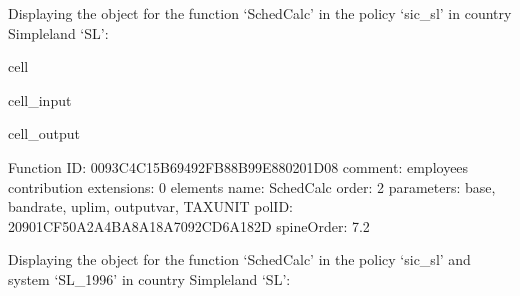 \documentclass[letterpaper,10pt,english]{sphinxmanual}
\begin{document}
\sphinxAtStartPar
Displaying the  object for the function ‘SchedCalc’ in the policy ‘sic\_sl’ in country Simpleland ‘SL’:

\begin{sphinxuseclass}{cell}
\begin{sphinxuseclass}{cell_input}
\begin{sphinxVerbatim}[commandchars=\\\{\}]
\PYG{p}{[}\PYG{p}{]}\PYG{p}{[}\PYG{p}{]}\PYG{p}{[}\PYG{p}{]}
\end{sphinxVerbatim}

\end{sphinxuseclass}
\begin{sphinxuseclass}{cell_output}
\begin{sphinxVerbatim}[commandchars=\\\{\}]
\PYGZhy{}\PYGZhy{}\PYGZhy{}\PYGZhy{}\PYGZhy{}\PYGZhy{}\PYGZhy{}\PYGZhy{}\PYGZhy{}\PYGZhy{}\PYGZhy{}\PYGZhy{}\PYGZhy{}\PYGZhy{}\PYGZhy{}\PYGZhy{}\PYGZhy{}\PYGZhy{}\PYGZhy{}\PYGZhy{}\PYGZhy{}\PYGZhy{}\PYGZhy{}\PYGZhy{}\PYGZhy{}\PYGZhy{}\PYGZhy{}\PYGZhy{}\PYGZhy{}\PYGZhy{}
Function
\PYGZhy{}\PYGZhy{}\PYGZhy{}\PYGZhy{}\PYGZhy{}\PYGZhy{}\PYGZhy{}\PYGZhy{}\PYGZhy{}\PYGZhy{}\PYGZhy{}\PYGZhy{}\PYGZhy{}\PYGZhy{}\PYGZhy{}\PYGZhy{}\PYGZhy{}\PYGZhy{}\PYGZhy{}\PYGZhy{}\PYGZhy{}\PYGZhy{}\PYGZhy{}\PYGZhy{}\PYGZhy{}\PYGZhy{}\PYGZhy{}\PYGZhy{}\PYGZhy{}\PYGZhy{}
	 ID: \PYGZsq{}0093C4C1\PYGZhy{}5B69\PYGZhy{}492F\PYGZhy{}B88B\PYGZhy{}99E880201D08\PYGZsq{}
	 comment: \PYGZdq{}employee\PYGZsq{}s contribution\PYGZdq{}
	 extensions: 0 elements
	 name: \PYGZsq{}SchedCalc\PYGZsq{}
	 order: \PYGZsq{}2\PYGZsq{}
	 parameters: base, band\PYGZus{}rate, uplim, output\PYGZus{}var, TAX\PYGZus{}UNIT
	 polID: \PYGZsq{}20901CF5\PYGZhy{}0A2A\PYGZhy{}4BA8\PYGZhy{}A18A\PYGZhy{}7092CD6A182D\PYGZsq{}
	 spineOrder: \PYGZsq{}7.2\PYGZsq{}
\end{sphinxVerbatim}

\end{sphinxuseclass}
\end{sphinxuseclass}
\sphinxAtStartPar
Displaying the  object for the function ‘SchedCalc’ in the policy ‘sic\_sl’ and system ‘SL\_1996’ in country Simpleland ‘SL’:
\end{document}
